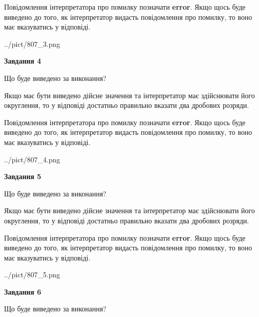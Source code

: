 \documentclass[12pt, ukrainian]{article}
\begin{document}
{\begin {Large}
Повідомлення інтерпретатора про помилку позначати \textbf{error}.
Якщо щось буде виведено до того, як інтерпретатор видасть повідомлення про помилку, 
то воно має вказуватись у відповіді. \par

\begin{center}
	{../pict/807_3.png}
\end{center}
\newpage

{\begin {center}\textbf{Завдання 4}\end {center}}\par
Що буде виведено за виконання? \par

Якщо має бути виведено дійсне значення та інтерпретатор має здійснювати його округлення, 
то у відповіді достатньо правильно вказати два дробових розряди.

Повідомлення інтерпретатора про помилку позначати \textbf{error}.
Якщо щось буде виведено до того, як інтерпретатор видасть повідомлення про помилку, 
то воно має вказуватись у відповіді. \par

\begin{center}
	{../pict/807_4.png}
\end{center}
\newpage

{\begin {center}\textbf{Завдання 5}\end {center}}\par
Що буде виведено за виконання? \par

Якщо має бути виведено дійсне значення та інтерпретатор має здійснювати його округлення, 
то у відповіді достатньо правильно вказати два дробових розряди.

Повідомлення інтерпретатора про помилку позначати \textbf{error}.
Якщо щось буде виведено до того, як інтерпретатор видасть повідомлення про помилку, 
то воно має вказуватись у відповіді. \par

\begin{center}
	{../pict/807_5.png}
\end{center}
\newpage

{\begin {center}\textbf{Завдання 6}\end {center}}\par
Що буде виведено за виконання? \par


\end{Large}}
\end{document}
